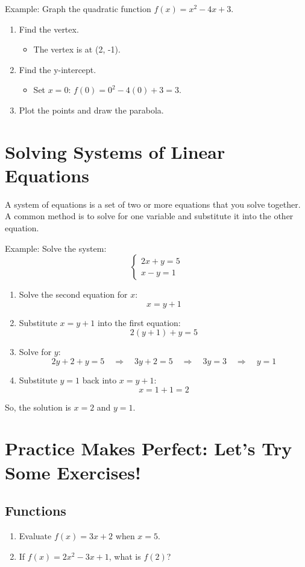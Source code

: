 Example: Graph the quadratic function \( f(x) = x^2 - 4x + 3 \).
\begin{enumerate}
    \item Find the vertex.
    \begin{itemize}
        \item The vertex is at (2, -1).
    \end{itemize}
    \item Find the y-intercept.
    \begin{itemize}
        \item Set \( x = 0 \): \( f(0) = 0^2 - 4(0) + 3 = 3 \).
    \end{itemize}
    \item Plot the points and draw the parabola.
\end{enumerate}

\section{Solving Systems of Linear Equations}
A system of equations is a set of two or more equations that you solve together. A common method is to solve for one variable and substitute it into the other equation.

Example: Solve the system:
\[
\begin{cases}
2x + y = 5 \\
x - y = 1
\end{cases}
\]
\begin{enumerate}
    \item Solve the second equation for \( x \):
    \[ x = y + 1 \]
    \item Substitute \( x = y + 1 \) into the first equation:
    \[ 2(y + 1) + y = 5 \]
    \item Solve for \( y \):
    \[ 2y + 2 + y = 5 \quad \Rightarrow \quad 3y + 2 = 5 \quad \Rightarrow \quad 3y = 3 \quad \Rightarrow \quad y = 1 \]
    \item Substitute \( y = 1 \) back into \( x = y + 1 \):
    \[ x = 1 + 1 = 2 \]
\end{enumerate}
So, the solution is \( x = 2 \) and \( y = 1 \).

\section{Practice Makes Perfect: Let’s Try Some Exercises!}
\subsection*{Functions}
\begin{enumerate}
    \item Evaluate \( f(x) = 3x + 2 \) when \( x = 5 \).
    \item If \( f(x) = 2x^2 - 3x + 1 \), what is \( f(2) \)?
\end{enumerate}

